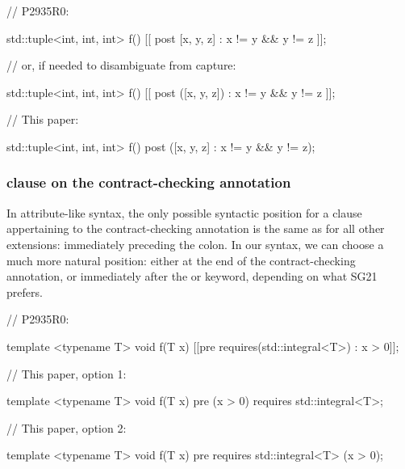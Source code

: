 \begin{minipage}[t]{8cm}
\begin{codeblock}
// P2935R0:

std::tuple<int, int, int> f()
  [[ post [x, y, z] : x != y && y != z ]];
  
// or, if needed to disambiguate from capture:

std::tuple<int, int, int> f()
  [[ post ([x, y, z]) : x != y && y != z ]];
\end{codeblock}
\end{minipage}
\begin{minipage}[t]{8cm}
\begin{codeblock}
// This paper:

std::tuple<int, int, int> f()
  post ([x, y, z] : x != y && y != z);
\end{codeblock}
\end{minipage}

\subsubsection{ clause on the contract-checking annotation}

In attribute-like syntax, the only possible syntactic position for a   clause appertaining to the contract-checking annotation is the same as for all other extensions: immediately preceding the colon. In our syntax, we can choose a much more natural position: either at the end of the contract-checking annotation, or immediately after the  or  keyword, depending on what SG21 prefers.


\begin{minipage}[t]{8.7cm}
\begin{codeblock}
// P2935R0:

template <typename T>
void f(T x)
  [[pre requires(std::integral<T>) : x > 0]];
\end{codeblock}
\end{minipage}
\begin{minipage}[t]{8cm}
\begin{codeblock}
// This paper, option 1:

template <typename T>
void f(T x)
  pre (x > 0) requires std::integral<T>;
    
// This paper, option 2:

template <typename T>
void f(T x)
  pre requires std::integral<T> (x > 0);
\end{codeblock}
\end{minipage}

